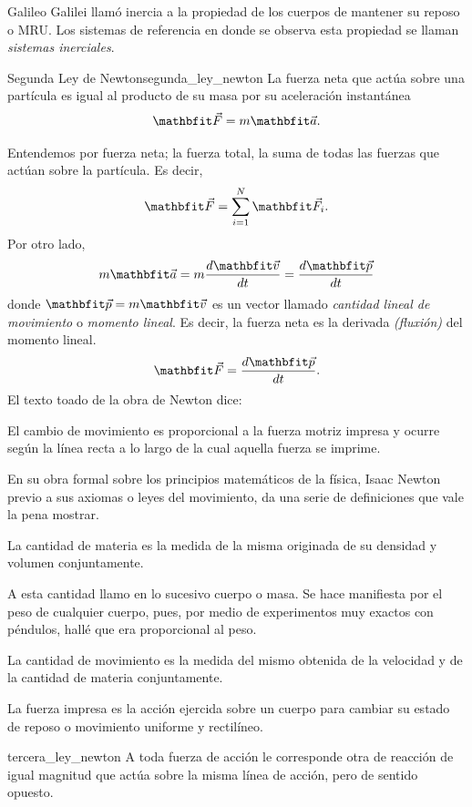 Galileo Galilei llamó inercia a la propiedad de los cuerpos de mantener su reposo o MRU. Los sistemas de referencia en donde se observa esta propiedad se llaman \textit{sistemas inerciales}.

\begin{definition}{Segunda Ley de Newton}{segunda_ley_newton}
    La fuerza neta que actúa sobre una partícula es igual al producto de su masa por su aceleración instantánea
    $$\F = m\acei.$$
\end{definition}

Entendemos por fuerza neta; la fuerza total, la suma de todas las fuerzas que actúan sobre la
partícula. Es decir,
$$\F = \sum_{i=1}^{N}\F_i.$$
Por otro lado,
$$m\acei = m \frac{d\veloi}{dt} = \frac{d\posi}{dt}$$
donde $\posi = m\veloi$ es un vector llamado \textit{cantidad lineal de movimiento} o \textit{momento lineal}. Es decir, la fuerza neta es la derivada \textit{(fluxión)} del momento lineal.
$$\F = \frac{d\posi}{dt}.$$
El texto toado de la obra de Newton dice:
\begin{segunda}
    El cambio de movimiento es proporcional a la fuerza motriz impresa y ocurre según la línea recta a lo largo de la cual aquella fuerza se imprime.
\end{segunda}

En su obra formal sobre los principios matemáticos de la física, Isaac Newton previo a sus axiomas o leyes del movimiento, da una serie de definiciones que vale la pena mostrar.
\begin{defpri}
    La cantidad de materia es la medida de la misma originada de su densidad y volumen conjuntamente.
    
    A esta cantidad llamo en lo sucesivo cuerpo o masa. Se hace manifiesta por el peso de cualquier cuerpo, pues, por medio de experimentos muy exactos con péndulos, hallé que era proporcional al peso.
\end{defpri}

\begin{defseg}
    La cantidad de movimiento es la medida del mismo obtenida de la velocidad y de la cantidad de materia conjuntamente.
\end{defseg}

\begin{defcua}
    La fuerza impresa es la acción ejercida sobre un cuerpo para cambiar su estado de reposo o movimiento uniforme y rectilíneo.
\end{defcua}

\begin{definition}{}{tercera_ley_newton}
    A toda fuerza de acción le corresponde otra de reacción de igual magnitud que actúa sobre la misma línea de acción, pero de sentido opuesto.
\end{definition}

